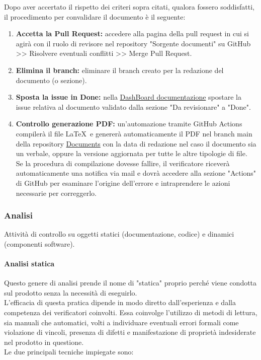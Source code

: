 Dopo aver accertato il rispetto dei criteri sopra citati, qualora fossero soddisfatti, il procedimento per convalidare il documento è il seguente:

\begin{enumerate}
    \item \textbf{Accetta la Pull Request:} 
        accedere alla pagina della pull request in cui si agirà con il ruolo di revisore nel repository "Sorgente documenti" su GitHub >> Risolvere eventuali conflitti >> Merge Pull Request.
    \item \textbf{Elimina il branch:} 
        eliminare il branch creato per la redazione del documento (o sezione).
    \item \textbf{Sposta la issue in Done:} 
        nella \href{https://github.com/orgs/ByteOps-swe/projects/1/views/1}{DashBoard documentazione} spostare la issue relativa al documento validato dalla sezione "Da revisionare" a "Done".
    \item \textbf{Controllo generazione PDF:} 
        un'automazione tramite GitHub Actions compilerà il file \LaTeX\ e genererà automaticamente il PDF nel branch main della repository \href{https://github.com/ByteOps-swe/Documents}{Documents} con la data di redazione nel caso il documento sia un verbale, oppure la versione aggiornata per tutte le altre tipologie di file. \\
        Se la procedura di compilazione dovesse fallire, il verificatore riceverà automaticamente una notifica via mail e dovrà accedere alla sezione "Actions" di GitHub per esaminare l'origine dell'errore e intraprendere le azioni necessarie per correggerlo.
\end{enumerate}

\subsubsection{Analisi}
Attività di controllo su oggetti statici (documentazione, codice) e dinamici (componenti software).

\paragraph{Analisi statica}
Questo genere di analisi prende il nome di "statica" proprio perché viene condotta sul prodotto senza la necessità di eseguirlo. \\ L'efficacia di questa pratica dipende in modo diretto dall'esperienza e dalla competenza dei verificatori coinvolti. Essa coinvolge l'utilizzo di metodi di lettura, sia manuali che automatici, volti a individuare eventuali errori formali come violazione di vincoli, presenza di difetti e manifestazione di proprietà indesiderate nel prodotto in questione. \\
Le due principali tecniche impiegate sono:


